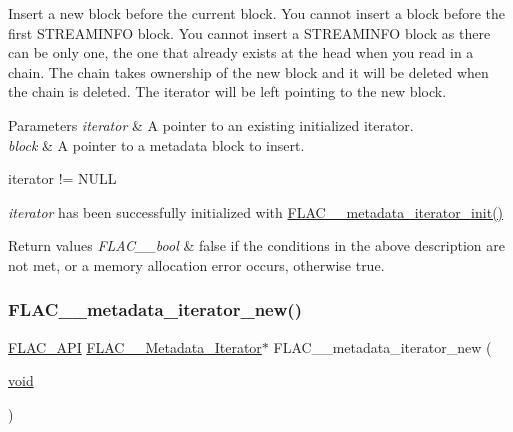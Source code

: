 Insert a new block before the current block. You cannot insert a block before the first S\+T\+R\+E\+A\+M\+I\+N\+FO block. You cannot insert a S\+T\+R\+E\+A\+M\+I\+N\+FO block as there can be only one, the one that already exists at the head when you read in a chain. The chain takes ownership of the new block and it will be deleted when the chain is deleted. The iterator will be left pointing to the new block.


\begin{DoxyParams}{Parameters}
{\em iterator} & A pointer to an existing initialized iterator. \\
\hline
{\em block} & A pointer to a metadata block to insert.  
\begin{DoxyCode}
iterator != NULL 
\end{DoxyCode}
 {\itshape iterator} has been successfully initialized with \hyperlink{group__flac__metadata__level2_ga4a5af69a1f19436b02f738eb8c97c959}{F\+L\+A\+C\+\_\+\+\_\+metadata\+\_\+iterator\+\_\+init()} \\
\hline
\end{DoxyParams}

\begin{DoxyRetVals}{Return values}
{\em F\+L\+A\+C\+\_\+\+\_\+bool} & {\ttfamily false} if the conditions in the above description are not met, or a memory allocation error occurs, otherwise {\ttfamily true}. \\
\hline
\end{DoxyRetVals}
\mbox{\label{group__flac__metadata__level2_gac988906d63bd2ddc910d8f0b118591f7}} 
\subsubsection{\texorpdfstring{F\+L\+A\+C\+\_\+\+\_\+metadata\+\_\+iterator\+\_\+new()}{FLAC\_\_metadata\_iterator\_new()}}
{\footnotesize\ttfamily \hyperlink{group__flac__export_ga56ca07df8a23310707732b1c0007d6f5}{F\+L\+A\+C\+\_\+\+A\+PI} \hyperlink{group__flac__metadata__level2_ga9f3e135a07cdef7e51597646aa7b89b2}{F\+L\+A\+C\+\_\+\+\_\+\+Metadata\+\_\+\+Iterator}$\ast$ F\+L\+A\+C\+\_\+\+\_\+metadata\+\_\+iterator\+\_\+new (\begin{DoxyParamCaption}\item[{\hyperlink{png_8h_ac9c84fa68bbad002983e35ce3663c686}{void}}]{ }\end{DoxyParamCaption})}

